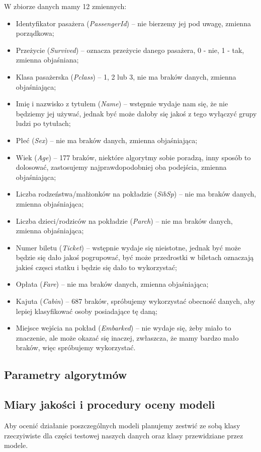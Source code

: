\documentclass{article}
\begin{document}
W zbiorze danych mamy 12 zmiennych:
\begin{itemize}
\item Identyfikator pasażera ({\itshape PassengerId}) -- nie bierzemy jej pod uwagę, zmienna porządkowa;
\item Przeżycie ({\itshape Survived}) -- oznacza przeżycie danego pasażera, 0 - nie, 1 - tak, zmienna objaśniana;
\item Klasa pasażerska ({\itshape Pclass}) -- 1, 2 lub 3, nie ma braków danych, zmienna objaśniająca;
\item Imię i nazwisko z tytułem ({\itshape Name}) -- wstępnie wydaje nam się, że nie będziemy jej używać, jednak być może dałoby się jakoś z tego wyłączyć grupy ludzi po tytułach;
\item Płeć ({\itshape Sex}) -- nie ma braków danych, zmienna objaśniająca;
\item Wiek ({\itshape Age}) -- 177 braków, niektóre algorytmy sobie poradzą, inny sposób to dolosować, zastosujemy najprawdopodobniej oba podejścia, zmienna objaśniająca;
\item Liczba rodzeństwa/małżonków na pokładzie ({\itshape SibSp}) -- nie ma braków danych, zmienna objaśniająca;
\item Liczba dzieci/rodziców na pokładzie ({\itshape Parch}) -- nie ma braków danych, zmienna objaśniająca;
\item Numer biletu ({\itshape Ticket}) -- wstępnie wydaje się nieistotne, jednak być może będzie się dało jakoś pogrupować, być może przedrostki w biletach oznaczają jakieś częsci statku i będzie się dało to wykorzystać;
\item Opłata ({\itshape Fare}) -- nie ma braków danych, zmienna objaśniająca;
\item Kajuta ({\itshape Cabin}) -- 687 braków, spróbujemy wykorzystać obecność danych, aby lepiej klasyfikować osoby posiadające tę daną;
\item Miejsce wejścia na pokład ({\itshape Embarked}) -- nie wydaje się, żeby miało to znaczenie, ale może okazać się inaczej, zwłaszcza, że mamy bardzo mało braków, więc spróbujemy wykorzystać.
\end{itemize}

\subsection{Parametry algorytmów}
\subsection{Miary jakości i procedury oceny modeli}
Aby ocenić działanie poszczególnych modeli planujemy zestwić ze sobą klasy rzeczyiwiste dla części testowej naszych danych oraz klasy przewidziane przez modele.
\end{document}
